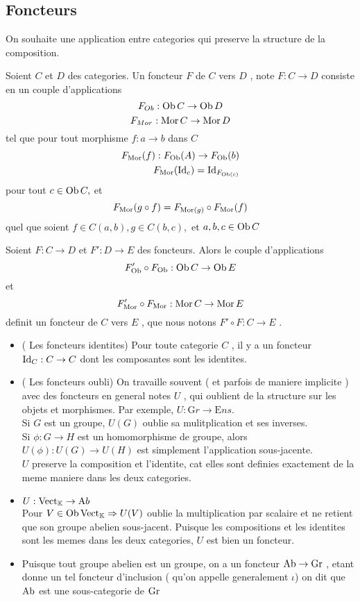 \documentclass[../main.tex]{subfiles}
\begin{document}
\subsection{Foncteurs}
On souhaite une application entre categories qui preserve la structure de la composition.
\begin{defn}[Foncteur]
	Soient $C$ et $D$ des categories. Un foncteur $F$ de $C$ vers $D$ , note $F:C \to D$ consiste en un couple d'applications
	\[ 
	F_{Ob} :\operatorname{Ob} C \to \operatorname{Ob} D
	\]
	\[ 
	F_{Mor} : \operatorname{Mor} C\to \operatorname{Mor} D
	\]
	tel que pour tout morphisme $f:a\to b$ dans $C$ 
	\begin{align*}
		F_{\operatorname{Mor}} ( f) : F_{\operatorname{Ob}} ( A) \to F_{\operatorname{Ob}} ( b) \\
	F_{ \operatorname{Mor} } ( \operatorname{Id}_c) = \operatorname{Id}_{F_{ \operatorname{Ob}( c) }  } 	
	\end{align*}
pour tout $c \in \operatorname{Ob} C,$ et 
\[ 
	F_{\operatorname{Mor}} ( g\circ f) = F_{\operatorname{Mor}( g) } \circ F_{\operatorname{Mor}} ( f) 
\]
quel que soient $f\in C( a,b) , g \in C( b,c),$ et $a,b,c \in \operatorname{Ob} C$ 
	
\end{defn}
\begin{lemma}
Soient $F:C \to D$ et $F': D \to E$ des foncteurs. Alors le couple d'applications
\[ 
F'_{\operatorname{Ob}} \circ F_{\operatorname{Ob}} : \operatorname{Ob} C \to \operatorname{Ob} E
\]
et 
\[ 
	F'_{\operatorname{Mor}} \circ F_{\operatorname{Mor}} : \operatorname{Mor} C \to \operatorname{Mor} E
\]
definit un foncteur de $C$ vers $E$ , que nous notons $F'\circ F : C \to E$ . 
\end{lemma}
\begin{itemize}
	\item ( Les foncteurs identites) Pour toute categorie $C$ , il y a un foncteur $\operatorname{Id}_C: C \to C$ dont les composantes sont les identites.
	\item ( Les foncteurs oubli) On travaille souvent ( et parfois de maniere implicite ) avec des foncteurs en general notes $U$ , qui oublient de la structure sur les objets et morphismes. Par exemple,
		$U : \mathrm Gr \to \mathrm Ens$. \\
		Si $G$ est un groupe, $U( G) $ oublie sa mulitplication et ses inverses. \\
		Si $\phi: G \to H $ est un homomorphisme de groupe, alors $U( \phi) : U( G) \to U( H) $ est simplement l'application sous-jacente.\\
		$U$ preserve la composition et l'identite, cat elles sont definies exactement de la meme maniere dans les deux categories.
	\item $U: \operatorname{Vect}_{ \mathbb{K} }\to \mathrm Ab$\\
		Pour $V \in \operatorname{Ob} \operatorname{Vect}_{\mathbb{K}} \Rightarrow U( V)  $ oublie la multiplication par scalaire et ne retient que son groupe abelien sous-jacent. 
Puisque les compositions et les identites sont les memes dans les deux categories, $U$ est bien un foncteur. 
\item Puisque tout groupe abelien est un groupe, on a un foncteur $\operatorname{Ab} \to \operatorname{Gr}$ , etant donne un tel foncteur d'inclusion ( qu'on appelle generalement $\iota$) on dit que $\operatorname{Ab} $ est une sous-categorie de $\operatorname{Gr}$ 
\end{itemize}
\end{document}
